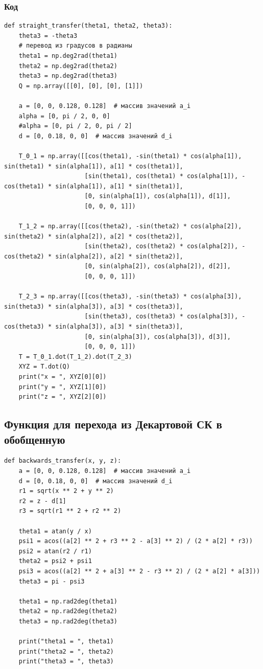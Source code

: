 \documentclass{article}
\begin{document}
\subsubsection*{Код}
\begin{verbatim}
def straight_transfer(theta1, theta2, theta3):
    theta3 = -theta3
    # перевод из градусов в радианы
    theta1 = np.deg2rad(theta1)
    theta2 = np.deg2rad(theta2)
    theta3 = np.deg2rad(theta3)
    Q = np.array([[0], [0], [0], [1]])

    a = [0, 0, 0.128, 0.128]  # массив значений a_i
    alpha = [0, pi / 2, 0, 0]
    #alpha = [0, pi / 2, 0, pi / 2]
    d = [0, 0.18, 0, 0]  # массив значений d_i

    T_0_1 = np.array([[cos(theta1), -sin(theta1) * cos(alpha[1]), sin(theta1) * sin(alpha[1]), a[1] * cos(theta1)],
                      [sin(theta1), cos(theta1) * cos(alpha[1]), -cos(theta1) * sin(alpha[1]), a[1] * sin(theta1)],
                      [0, sin(alpha[1]), cos(alpha[1]), d[1]],
                      [0, 0, 0, 1]])

    T_1_2 = np.array([[cos(theta2), -sin(theta2) * cos(alpha[2]), sin(theta2) * sin(alpha[2]), a[2] * cos(theta2)],
                      [sin(theta2), cos(theta2) * cos(alpha[2]), -cos(theta2) * sin(alpha[2]), a[2] * sin(theta2)],
                      [0, sin(alpha[2]), cos(alpha[2]), d[2]],
                      [0, 0, 0, 1]])

    T_2_3 = np.array([[cos(theta3), -sin(theta3) * cos(alpha[3]), sin(theta3) * sin(alpha[3]), a[3] * cos(theta3)],
                      [sin(theta3), cos(theta3) * cos(alpha[3]), -cos(theta3) * sin(alpha[3]), a[3] * sin(theta3)],
                      [0, sin(alpha[3]), cos(alpha[3]), d[3]],
                      [0, 0, 0, 1]])
    T = T_0_1.dot(T_1_2).dot(T_2_3)
    XYZ = T.dot(Q)
    print("x = ", XYZ[0][0])
    print("y = ", XYZ[1][0])
    print("z = ", XYZ[2][0])
\end{verbatim}

\subsection{Функция для перехода из Декартовой СК в обобщенную}
\begin{verbatim}
def backwards_transfer(x, y, z):
    a = [0, 0, 0.128, 0.128]  # массив значений a_i
    d = [0, 0.18, 0, 0]  # массив значений d_i
    r1 = sqrt(x ** 2 + y ** 2)
    r2 = z - d[1]
    r3 = sqrt(r1 ** 2 + r2 ** 2)
    
    theta1 = atan(y / x)
    psi1 = acos((a[2] ** 2 + r3 ** 2 - a[3] ** 2) / (2 * a[2] * r3))
    psi2 = atan(r2 / r1)
    theta2 = psi2 + psi1
    psi3 = acos((a[2] ** 2 + a[3] ** 2 - r3 ** 2) / (2 * a[2] * a[3]))
    theta3 = pi - psi3

    theta1 = np.rad2deg(theta1)
    theta2 = np.rad2deg(theta2)
    theta3 = np.rad2deg(theta3)

    print("theta1 = ", theta1)
    print("theta2 = ", theta2)
    print("theta3 = ", theta3)
\end{verbatim}
\end{document}
